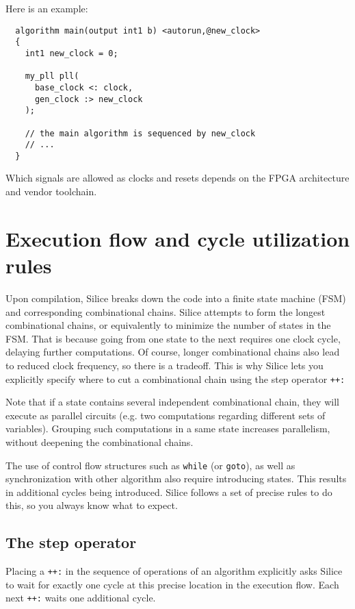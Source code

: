 \documentclass[a4]{article}
\newcommand\silice{Silice}
\begin{document}
Here is an example:
\begin{verbatim}
  algorithm main(output int1 b) <autorun,@new_clock>
  {
    int1 new_clock = 0;

    my_pll pll(
      base_clock <: clock,
      gen_clock :> new_clock
    );

    // the main algorithm is sequenced by new_clock
    // ...
  }
\end{verbatim}

Which signals are allowed as clocks and resets depends on the FPGA architecture
and vendor toolchain.



\section{Execution flow and cycle utilization rules}
\label{sec:execflow}

Upon compilation, \silice{} breaks down the code into a finite state machine (FSM) and corresponding combinational chains.
%
\silice{} attempts to form the longest combinational chains, or equivalently
to minimize the number of states in the FSM. That is because going from one state to the next requires one clock cycle, delaying further computations.
%
Of course, longer combinational chains also lead to reduced clock frequency, so
there is a tradeoff. This is why \silice{} lets you explicitly specify where to cut a combinational chain using the step operator \texttt{++:}

Note that if a state contains several independent combinational chain, they will execute as parallel circuits (e.g. two computations regarding different sets of variables). Grouping such computations in a same state increases parallelism, without deepening the combinational chains.

The use of control flow structures such as \texttt{while} (or \texttt{goto}), as well as synchronization with other algorithm also require introducing states. This results in additional cycles being introduced. \silice{} follows a set of precise rules to do this, so you always know what to expect.

\subsection{The {step} operator}
\label{sec:step}

Placing a \texttt{++:} in the sequence of operations of an algorithm explicitly asks \silice{} to wait for exactly one cycle at this precise location in the execution flow. Each next \texttt{++:} waits one additional cycle.
\end{document}

